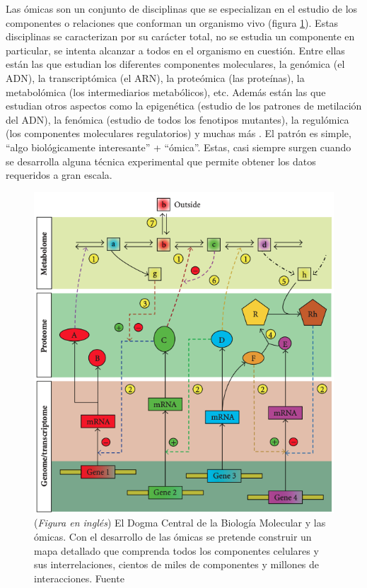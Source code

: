 Las ómicas son un conjunto de disciplinas que se especializan en el estudio de los componentes o relaciones que conforman un organismo vivo (figura \ref{fig:Central_Dogma}).
Estas disciplinas se caracterizan por su carácter total, no se estudia un componente en particular, se intenta alcanzar a todos en el organismo en cuestión.
Entre ellas están las que estudian los diferentes componentes moleculares, la genómica (el ADN), la transcriptómica (el ARN), la proteómica (las proteínas), la metabolómica (los intermediarios metabólicos), etc.
Además están las que estudian otros aspectos como la epigenética (estudio de los patrones de metilación del ADN), la fenómica (estudio de todos los fenotipos mutantes), la regulómica (los componentes moleculares regulatorios) y muchas más \cite{evansDesignerScienceOmic2000}.
El patrón es simple, ``algo biológicamente interesante'' + ``ómica''.
Estas, casi siempre surgen cuando se desarrolla alguna técnica experimental que permite obtener los datos requeridos a gran escala.

\begin{figure}[tb]
  \centering
  \includegraphics[width=0.7\columnwidth]{images/Central_Dogma.png}
  \caption{
      (\textit{Figura en inglés})
      El Dogma Central de la Biología Molecular y las ómicas.
      Con el desarrollo de las ómicas se pretende construir un mapa detallado que comprenda todos los componentes celulares y sus interrelaciones, cientos de miles de componentes y millones de interacciones.
      Fuente \cite{likicSystemsBiologyNext2010a}}
  \label{fig:Central_Dogma}
\end{figure}

